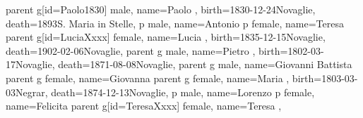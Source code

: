 \documentclass{article}
\begin{document}
\begin{midpage}
\begin{center}
\begin{genealogypicture}
{{{{{{                    }
                    parent{
                        g[id=Paolo1830]{
                            male,
                            name={Paolo },
                            birth={1830-12-24}{Novaglie},
                            death={1893}{S. Maria in Stelle},
                        }
                        p{
                            male,
                            name={Antonio }
                        }
                        p{
                            female,
                            name={Teresa }
                        }
                    }
                    parent{
                        g[id=LuciaXxxx]{
                            female,
                            name={Lucia },
                            birth={1835-12-15}{Novaglie},
                            death={1902-02-06}{Novaglie},
                        }
                        parent{
                            g{
                                male,
                                name={Pietro },
                                birth={1802-03-17}{Novaglie},
                                death={1871-08-08}{Novaglie},
                            }
                            parent{
                                g{
                                    male,
                                    name={Giovanni Battista }
                                }
                            }
                            parent{
                                g{
                                    female,
                                    name={Giovanna }
                                }
                            }
                        }
                        parent{
                            g{
                                female,
                                name={Maria },
                                birth={1803-03-03}{Negrar},
                                death={1874-12-13}{Novaglie},
                            }
                            p{
                                male,
                                name={Lorenzo }
                            }
                            p{
                                female,
                                name={Felicita }
                            }
                        }
                    }
                }
            }
        }
        parent{
            g[id=TeresaXxxx]{
                female,
                name={Teresa },
}}}}
\end{genealogypicture}
\end{center}
\end{midpage}
\end{document}
